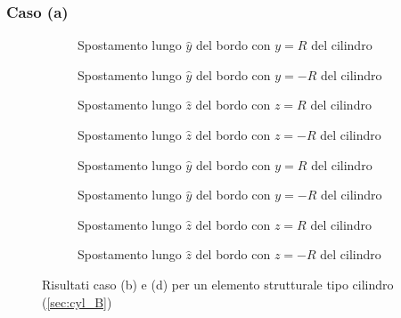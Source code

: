 \documentclass[a4paper,num-refs]{oup-contemporary}
\begin{document}
\subsubsection{Caso (a)}
\label{sec:cyl_A}
\begin{figure}[bt!]
	\centering
	\begin{subfigure}[t]{0.23\textwidth}
		\centering
		\caption{Spostamento lungo $\hat y$ del bordo con $y=R$ del cilindro}
		
	\end{subfigure}
	\hfill
	\begin{subfigure}[t]{0.23\textwidth}
		\centering
		
		\caption{Spostamento lungo $\hat y$ del bordo con $y=-R$ del cilindro}
		
	\end{subfigure}
	\hfill
	\begin{subfigure}[t]{0.23\textwidth}
		\centering
		\caption{Spostamento lungo $\hat z$ del bordo con $z=R$ del cilindro}
	\end{subfigure}
	\hfill
		\begin{subfigure}[t]{0.23\textwidth}
		\centering
		\caption{Spostamento lungo $\hat z$ del bordo con $z=-R$ del cilindro}
	\end{subfigure}
	\hfill
	\caption{Risultati caso (a)  per un elemento strutturale tipo cilindro (\cref{sec:cyl_A})}
	\label{fig:cyl_A}
	
		\centering
	\begin{subfigure}[t]{0.23\textwidth}
		\centering
		\caption{Spostamento lungo $\hat y$ del bordo con $y=R$ del cilindro}
		
	\end{subfigure}
	\hfill
	\begin{subfigure}[t]{0.23\textwidth}
		\centering
		
		\caption{Spostamento lungo $\hat y$ del bordo con $y=-R$ del cilindro}
		
	\end{subfigure}
	\hfill
	\begin{subfigure}[t]{0.23\textwidth}
		\centering
		\caption{Spostamento lungo $\hat z$ del bordo con $z=R$ del cilindro}
	\end{subfigure}
	\hfill
	\begin{subfigure}[t]{0.23\textwidth}
		\centering
		\caption{Spostamento lungo $\hat z$ del bordo con $z=-R$ del cilindro}
	\end{subfigure}
	\hfill
	\caption{Risultati caso (b) e (d) per un elemento strutturale tipo cilindro (\cref{sec:cyl_B})}
	\label{fig:cyl_BD}
	

\end{figure}
\end{document}
